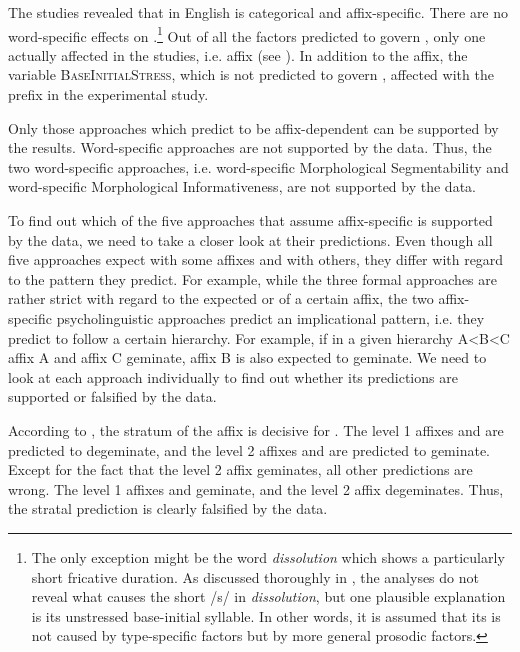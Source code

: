 The studies revealed that  in English is categorical and affix-specific. There are no word-specific effects on .\footnote{The only exception might be the word \textit{dissolution} which shows a particularly short fricative duration. As discussed thoroughly in , the analyses do not reveal what causes the short /s/ in \textit{dissolution}, but one plausible explanation is its unstressed base-initial syllable. In other words, it is assumed that its  is not caused by type-specific factors but by more general prosodic factors.} Out of all the factors predicted to govern , only one actually affected  in the studies, i.e. affix (see ). 
In addition to the affix, the variable \textsc{BaseInitialStress}, which is not predicted to govern ,  affected  with the prefix  in the experimental study. 

Only those approaches which predict  to be affix-dependent can be supported by the results. Word-specific approaches are not supported by the data.
Thus, the two word-specific approaches, i.e. word-specific Morphological Segmentability and word-specific Morphological Informativeness, are  not supported by the data. 

To find out which of the five approaches that assume affix-specific  is supported by the data, we need to take a closer look at their predictions. Even though all five approaches expect   with some affixes and  with others, they differ with regard to the  pattern they predict. For example, while the three formal approaches are rather strict with regard to the expected  or  of a  certain affix, the two affix-specific psycholinguistic approaches predict an implicational  pattern, i.e. they predict  to follow a certain hierarchy. For example, if in a given hierarchy A<B<C  affix A and affix C geminate, affix B is also expected to geminate. 
We need to look at each approach individually to find out whether its predictions are supported or falsified by the data. 

According to , the stratum of the affix is decisive for . The level 1 affixes  and  are predicted to degeminate, and the level 2 affixes  and  are predicted to geminate. Except for the fact that the level 2 affix  geminates, all other predictions are wrong. The level 1 affixes  and  geminate, and the level 2 affix  degeminates. Thus, the stratal prediction is clearly falsified by the data.

